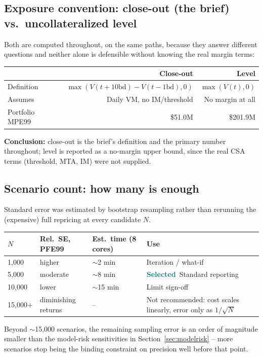 \documentclass[10pt,letterpaper]{article}
\newcommand{\good}{\textcolor{teal}{\textbf{Selected}}}
\begin{document}
\subsection{Exposure convention: close-out (the brief) vs.\ uncollateralized level}
Both are computed throughout, on the same paths, because they answer different questions and neither alone is defensible without knowing the real margin terms:
\begin{center}\small
\begin{tabular}{lrr}
\toprule
& \textbf{Close-out} & \textbf{Level} \\
\midrule
Definition & $\max(V(t{+}10\text{bd})-V(t{-}1\text{bd}),0)$ & $\max(V(t),0)$ \\
Assumes & Daily VM, no IM/threshold & No margin at all \\
Portfolio MPE99 & \$51.0M & \$201.9M \\
\bottomrule
\end{tabular}
\end{center}
\textbf{Conclusion:} close-out is the brief's definition and the primary number throughout; level is reported as a no-margin upper bound, since the real CSA terms (threshold, MTA, IM) were not supplied.

\subsection{Scenario count: how many is enough}
Standard error was estimated by bootstrap resampling rather than rerunning the (expensive) full repricing at every candidate $N$.
\begin{center}\small
\begin{tabular}{p{}p{}p{}p{}}
\toprule
\textbf{$N$} & \textbf{Rel.\ SE, PFE99} & \textbf{Est.\ time (8 cores)} & \textbf{Use} \\
\midrule
1,000 & higher & $\sim$2 min & Iteration / what-if \\
5,000 & moderate & $\sim$8 min & \good\ Standard reporting \\
10,000 & lower & $\sim$15 min & Limit sign-off \\
15,000+ & diminishing returns & -- & Not recommended: cost scales linearly, error only as $1/\sqrt{N}$ \\
\bottomrule
\end{tabular}
\end{center}
Beyond $\sim$15,000 scenarios, the remaining sampling error is an order of magnitude smaller than the model-risk sensitivities in Section~\ref{sec:modelrisk} -- more scenarios stop being the binding constraint on precision well before that point.
\end{document}
